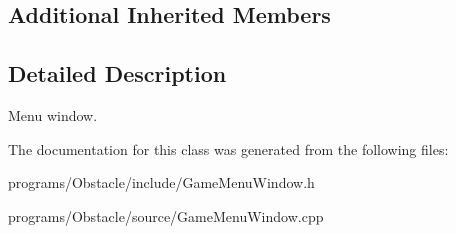 \subsection*{Additional Inherited Members}


\subsection{Detailed Description}
Menu window. 

The documentation for this class was generated from the following files\+:\begin{DoxyCompactItemize}
\item 
programs/\+Obstacle/include/Game\+Menu\+Window.\+h\item 
programs/\+Obstacle/source/Game\+Menu\+Window.\+cpp\end{DoxyCompactItemize}

